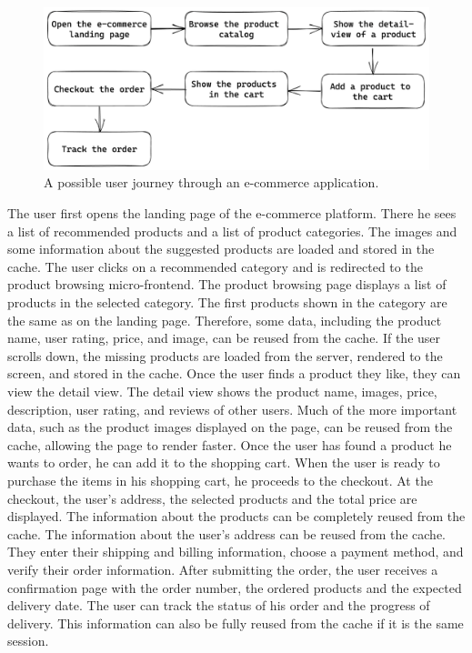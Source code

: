 \ifshowImages
\begin{figure}[H]
  \centering
  \includegraphics[width=0.8\linewidth]{images/future-work/flow-chart-e-commerce.png}
  \caption{A possible user journey through an e-commerce application.}\label{fig:future-work:flow-chart}
\end{figure}
\fi

\noindent The user first opens the landing page of the e-commerce platform. There he sees a list of recommended products and a list of product categories. The images and some information about the suggested products are loaded and stored in the cache. The user clicks on a recommended category and is redirected to the product browsing micro-frontend. The product browsing page displays a list of products in the selected category. The first products shown in the category are the same as on the landing page. Therefore, some data, including the product name, user rating, price, and image, can be reused from the cache. If the user scrolls down, the missing products are loaded from the server, rendered to the screen, and stored in the cache. Once the user finds a product they like, they can view the detail view. The detail view shows the product name, images, price, description, user rating, and reviews of other users. Much of the more important data, such as the product images displayed on the page, can be reused from the cache, allowing the page to render faster. Once the user has found a product he wants to order, he can add it to the shopping cart. When the user is ready to purchase the items in his shopping cart, he proceeds to the checkout. At the checkout, the user's address, the selected products and the total price are displayed. The information about the products can be completely reused from the cache. The information about the user's address can be reused from the cache. They enter their shipping and billing information, choose a payment method, and verify their order information. After submitting the order, the user receives a confirmation page with the order number, the ordered products and the expected delivery date. The user can track the status of his order and the progress of delivery. This information can also be fully reused from the cache if it is the same session.

